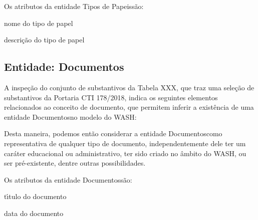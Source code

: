 \documentclass[
12pt,		%
openright,	%
twoside,  %
a4paper,			%
chapter=TITLE,		%
english,			%
french,				%
spanish,			%
brazil				%
]{USPSC-classe/USPSC}
\begin{document}
Os atributos da entidade \textquotedbl Tipos de Papeis\textquotedbl  s\~ao:



\begin{alineas}
\item nome do tipo de papel
\item descri\c{c}\~ao do tipo de papel
\end{alineas}

\subsection[Entidade: Documentos]{Entidade: Documentos}\label{Entidade: Documentos}
A inspe\c{c}\~ao do conjunto de substantivos da Tabela XXX, que traz uma sele\c{c}\~ao de substantivos da Portaria CTI 178/2018, indica os seguintes elementos relacionados ao conceito de \textquotedbl documento\textquotedbl , que permitem inferir a exist\^encia de uma entidade \textquotedbl Documentos\textquotedbl  no modelo do WASH:



\noindent\begin{center}\mbox{\centering{}}\end{center}


Desta maneira, podemos ent\~ao considerar a entidade \textquotedbl Documentos\textquotedbl  como representativa de qualquer tipo de documento, independentemente dele ter um car\'ater educacional ou administrativo, ter sido criado no \^ambito do WASH, ou ser pr\'e-existente, dentre outras possibilidades.


Os atributos da entidade \textquotedbl Documentos\textquotedbl  s\~ao:



\begin{alineas}
\item t\'{\i}tulo do documento
\item data do documento
\end{alineas}
\end{document}
